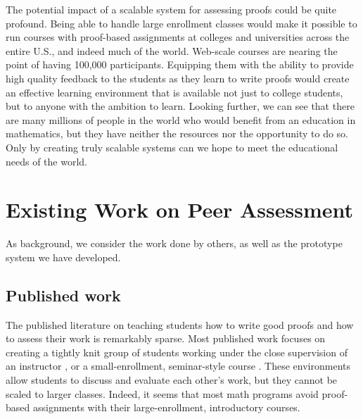 \documentclass[12pt]{article}
\begin{document}
The potential impact of a scalable system for assessing proofs could
be quite profound.  Being able to handle large enrollment classes
would make it possible to run courses with proof-based assignments at
colleges and universities across the entire U.S., and indeed much of
the world.  Web-scale courses are nearing the point of having 100,000
participants.  Equipping them with the ability to provide high quality
feedback to the students as they learn to write proofs would create an
effective learning environment that is available not just to college
students, but to anyone with the ambition to learn.  Looking further,
we can see that there are many millions of people in the world who
would benefit from an education in mathematics, but they have neither
the resources nor the opportunity to do so.  Only by creating truly
scalable systems can we hope to meet the educational needs of the world.

\section{Existing Work on Peer Assessment}

As background, we consider the work done by others, as well as the
prototype system we have developed.

\subsection{Published work}

The published literature on teaching students how to write good proofs
and how to assess their work is remarkably sparse.  Most published
work focuses on creating a tightly knit group of students working
under the close supervision of an instructor
\citep{cohen-amm82,jones-amm77}, or a small-enrollment, seminar-style
course \citep{reisel-amm82}.  These environments allow students to
discuss and evaluate each other's work, but they cannot be scaled to
larger classes.  Indeed, it seems that most math programs avoid
proof-based assignments with their large-enrollment, introductory
courses.
\end{document}
